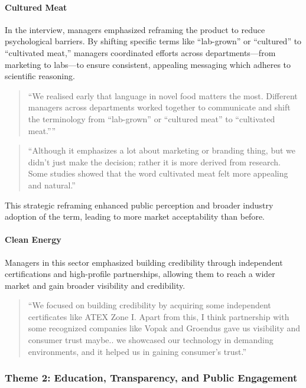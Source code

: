 \paragraph{Cultured Meat}
In the interview, managers emphasized reframing the product to reduce psychological barriers. By shifting specific terms like “lab-grown” or “cultured” to “cultivated meat,” managers coordinated efforts across departments—from marketing to labs—to ensure consistent, appealing messaging which adheres to scientific reasoning.
\begin{quote}
	“We realised early that language in novel food matters the most. Different managers across departments worked together to communicate and shift the terminology from “lab-grown” or “cultured meat” to “cultivated meat.””
\end{quote}
\begin{quote}
	“Although it emphasizes a lot about marketing or branding thing, but we didn’t just make the decision; rather it is more derived from research. Some studies showed that the word cultivated meat felt more appealing and natural.”
\end{quote}
This strategic reframing enhanced public perception and broader industry adoption of the term, leading to more market acceptability than before.

\paragraph{Clean Energy}
Managers in this sector emphasized building credibility through independent certifications and high-profile partnerships, allowing them to reach a wider market and gain broader visibility and credibility.
\begin{quote}
	“We focused on building credibility by acquiring some independent certificates like ATEX Zone I. Apart from this, I think partnership with some recognized companies like Vopak and Groendus gave us visibility and consumer trust maybe.. we showcased our technology in demanding environments, and it helped us in gaining consumer’s trust.”
\end{quote}

\subsubsection{Theme 2: Education, Transparency, and Public Engagement}

